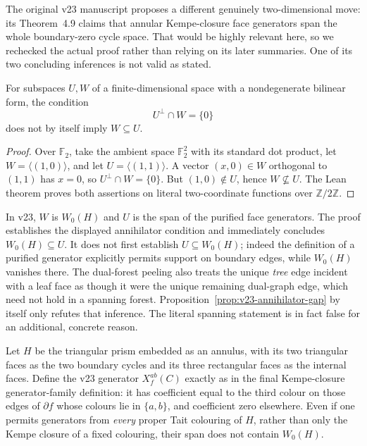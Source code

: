 The original v23 manuscript proposes a different genuinely two-dimensional
move: its Theorem~4.9 claims that annular Kempe-closure face generators span
the whole boundary-zero cycle space.  That would be highly relevant here, so
we rechecked the actual proof rather than relying on its later summaries.  One
of its two concluding inferences is not valid as stated.

\begin{proposition}
\label{prop:v23-annihilator-gap}
For subspaces $U,W$ of a finite-dimensional space with a nondegenerate
bilinear form, the condition
\[
                         U^\perp\cap W=\{0\}
\]
does not by itself imply $W\subseteq U$.
\end{proposition}

\begin{proof}
Over $\mathbb F_2$, take the ambient space $\mathbb F_2^2$ with its standard
dot product, let $W=\langle(1,0)\rangle$, and let
$U=\langle(1,1)\rangle$.  A vector $(x,0)\in W$ orthogonal to $(1,1)$ has
$x=0$, so $U^\perp\cap W=\{0\}$.  But $(1,0)\notin U$, hence
$W\nsubseteq U$.  The Lean theorem proves both assertions on literal
two-coordinate functions over $\mathbb Z/2\mathbb Z$.
\end{proof}

In v23, $W$ is $W_0(H)$ and $U$ is the span of the purified face generators.
The proof establishes the displayed annihilator condition and immediately
concludes $W_0(H)\subseteq U$.  It does not first establish $U\subseteq
W_0(H)$; indeed the definition of a purified generator explicitly permits
support on boundary edges, while $W_0(H)$ vanishes there.  The dual-forest
peeling also treats the unique \emph{tree} edge incident with a leaf face as
though it were the unique remaining dual-graph edge, which need not hold in a
spanning forest.  Proposition~\ref{prop:v23-annihilator-gap} by itself only
refutes that inference.  The literal spanning statement is in fact false for
an additional, concrete reason.

\begin{proposition}
\label{prop:v23-triangular-prism-spanning-counterexample}
Let $H$ be the triangular prism embedded as an annulus, with its two
triangular faces as the two boundary cycles and its three rectangular faces
as the internal faces.  Define the v23 generator $X_f^{ab}(C)$ exactly as in
the final Kempe-closure generator-family definition: it has coefficient equal
to the third colour on those edges of $\partial f$ whose colours lie in
$\{a,b\}$, and coefficient zero elsewhere.  Even if one permits generators
from \emph{every} proper Tait colouring of $H$, rather than only the Kempe
closure of a fixed colouring, their span does not contain $W_0(H)$.
\end{proposition}

